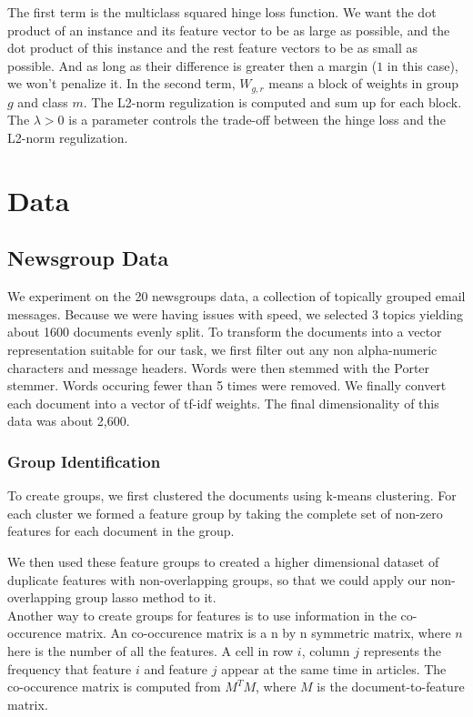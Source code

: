 \documentclass[11pt]{article}
\begin{document}
The first term is the multiclass squared hinge loss function. We want the dot product of an instance and its feature vector to be as large as possible, and the dot product of this instance and the rest feature vectors to be as small as possible. And as long as their difference is greater then a margin ($1$ in this case), we won't penalize it. In the second term, $W_{g,r}$ means a block of weights in group $g$ and class $m$. The L2-norm regulization is computed and sum up for each block. The $\lambda > 0$ is a parameter controls the trade-off between the hinge loss and the L2-norm regulization.  \\



\section{Data}

\subsection{Newsgroup Data}

We experiment on the 20 newsgroups data, a collection of topically grouped 
email messages. 
Because we were having issues with speed, we selected 3 topics yielding
about 1600 documents evenly split.
To transform the documents into a vector representation 
suitable for our task, we first filter out any non alpha-numeric characters
and message headers. Words were then stemmed with the Porter stemmer. 
Words occuring fewer than 5 times were removed.
We finally convert each document into a vector of tf-idf weights.
The final dimensionality of this data was about 2,600.

\subsubsection{Group Identification}

To create groups, we first clustered the documents using k-means clustering.
For each cluster we formed a feature group by taking the complete set of 
non-zero features for each document in the group.

We then used these feature groups to created a higher dimensional dataset of
duplicate features with non-overlapping groups, so that we could apply our
non-overlapping group lasso method to it.\\

Another way to create groups for features is to use information in the co-occurence matrix. An co-occurence matrix is a n by n symmetric matrix, where $n$ here is the number of all the features. A cell in row $i$, column $j$ represents the frequency that feature $i$ and feature $j$ appear at the same time in articles. The co-occurence matrix is computed from $M^T M$, where $M$ is the document-to-feature matrix. \\
\end{document}
